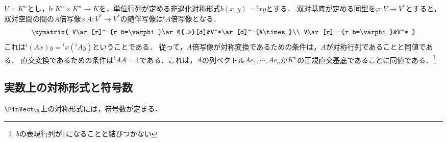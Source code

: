 \documentclass[uplatex, dvipdfmx]{jsreport}
\begin{document}
\begin{example}[標準内積]
    $V=K^n$とし，$b:K^n\times K^n\to K$を，単位行列が定める非退化対称形式$b(x,y)={}^t\!xy$とする．
    双対基底が定める同型を$\varphi:V\to V^*$とすると，双対空間の間の$A$倍写像$\times A:V^*\to V^*$の随伴写像は${}^t\!A$倍写像となる．
    \[\xymatrix{
        V\ar[r]^-{r_b=\varphi}\ar@{.>}[d]&V^*\ar[d]^-{A\times}\\
        V\ar[r]_-{r_b=\varphi}&V^*
    }\]
    これは${}^t\!(Ax)y={}^t\!x({}^t\!Ay)$ということである．
    従って，$A$倍写像が対称変換であるための条件は，$A$が対称行列であることと同値である．
    直交変換であるための条件は${}^t\!AA=1$である．これは，$A$の列ベクトル$Ae_1,\cdots,Ae_n$が$K^n$の正規直交基底であることに同値である．\footnote{$b$の表現行列が$1$になることと結びつかない}
\end{example}

\subsection{実数上の対称形式と符号数}

\begin{tcolorbox}[colframe=ForestGreen, colback=ForestGreen!10!white, breakable]
    $\FinVect_\R$上の対称形式には，符号数が定まる．
\end{tcolorbox}
\end{document}
